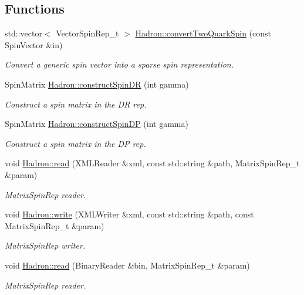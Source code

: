 \subsection*{Functions}
\begin{DoxyCompactItemize}
\item 
std\+::vector$<$ Vector\+Spin\+Rep\+\_\+t $>$ \mbox{\hyperlink{namespaceHadron_a87528a5f45980257a1473a3f77301a5b}{Hadron\+::convert\+Two\+Quark\+Spin}} (const Spin\+Vector \&in)
\begin{DoxyCompactList}\small\item\em Convert a generic spin vector into a sparse spin representation. \end{DoxyCompactList}\item 
Spin\+Matrix \mbox{\hyperlink{namespaceHadron_add425eaa856f87203aaf3bd1e3eb086d}{Hadron\+::construct\+Spin\+DR}} (int gamma)
\begin{DoxyCompactList}\small\item\em Construct a spin matrix in the DR rep. \end{DoxyCompactList}\item 
Spin\+Matrix \mbox{\hyperlink{namespaceHadron_af2328410f9a0a7191a4d319284425fed}{Hadron\+::construct\+Spin\+DP}} (int gamma)
\begin{DoxyCompactList}\small\item\em Construct a spin matrix in the DP rep. \end{DoxyCompactList}\item 
void \mbox{\hyperlink{namespaceHadron_ad46ef728c9d609cbf63217c66bdf0285}{Hadron\+::read}} (X\+M\+L\+Reader \&xml, const std\+::string \&path, Matrix\+Spin\+Rep\+\_\+t \&param)
\begin{DoxyCompactList}\small\item\em Matrix\+Spin\+Rep reader. \end{DoxyCompactList}\item 
void \mbox{\hyperlink{namespaceHadron_a433908e65befd36f268196398b8469c7}{Hadron\+::write}} (X\+M\+L\+Writer \&xml, const std\+::string \&path, const Matrix\+Spin\+Rep\+\_\+t \&param)
\begin{DoxyCompactList}\small\item\em Matrix\+Spin\+Rep writer. \end{DoxyCompactList}\item 
void \mbox{\hyperlink{namespaceHadron_af8ce56081c184ce7dd924a192bff08a6}{Hadron\+::read}} (Binary\+Reader \&bin, Matrix\+Spin\+Rep\+\_\+t \&param)
\begin{DoxyCompactList}\small\item\em Matrix\+Spin\+Rep reader. \end{DoxyCompactList}\item 

\end{DoxyCompactItemize}
